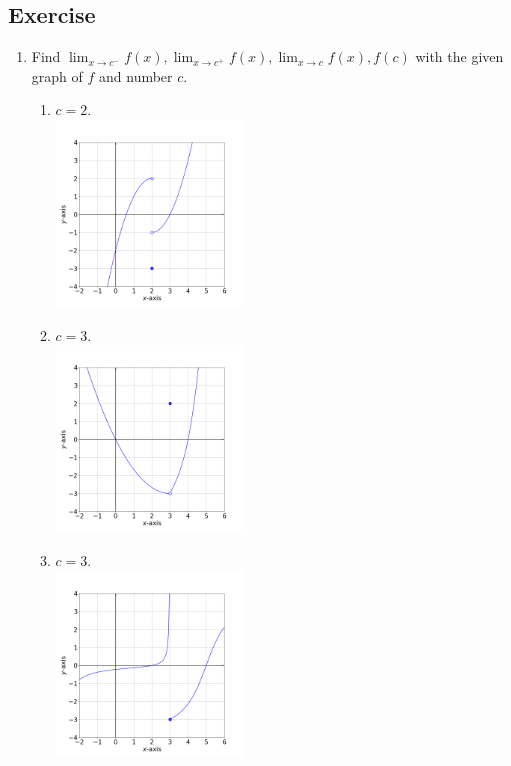 \documentclass[11pt]{book}
\theoremstyle{break}
\theoremstyle{no_label}
\numberwithin{equation}{section}
\begin{document}
\subsection*{Exercise}

\begin{enumerate}[label=\arabic*.]
    \item Find $\displaystyle\lim_{x\to c^-}f(x), \lim_{x\to c^+}f(x), \lim_{x\to c}f(x), f(c)$ with the given graph of $f$ and number $c$.
    \begin{multicols}{2}
        \begin{enumerate}
            \item $c=2$.\\
            \includegraphics[width=0.41\textwidth]{limit_ex_1.png}\\
            \phantom{\ }
            \item $c=3$.\\
            \includegraphics[width=0.41\textwidth]{limit_ex_2.png}\\
            \phantom{\ }
            \item $c=3$.\\
            \includegraphics[width=0.41\textwidth]{limit_ex_3.png}

\end{enumerate}
\end{multicols}
\end{enumerate}
\end{document}
